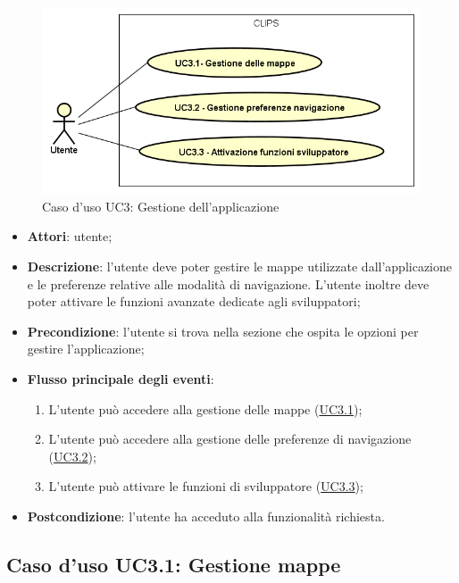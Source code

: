 \documentclass[../AnalisiDeiRequisiti.tex]{subfiles}
\begin{document}
        \begin{figure}[!h]
            \centering
            \includegraphics[scale=0.95, width=\textwidth]{img/UC3.png}
            \caption{Caso d'uso UC3: Gestione dell'applicazione}\label{fig:UC3} 
        \end{figure}
\begin{itemize}
\item \textbf{Attori}: utente;
\item \textbf{Descrizione}: l'utente deve poter gestire le mappe utilizzate dall'applicazione e le preferenze relative alle modalità di navigazione. L'utente inoltre deve poter attivare le funzioni avanzate dedicate agli sviluppatori; 
      \item \textbf{Precondizione}: l'utente si trova nella sezione che ospita le opzioni per gestire l'applicazione;

        \item \textbf{Flusso principale degli eventi}:
          \begin{enumerate}
          \item L'utente può accedere alla gestione delle mappe (\hyperlink{UC3.1}{UC3.1});
          \item L'utente può accedere alla gestione delle preferenze di navigazione (\hyperlink{UC3.2}{UC3.2});
          \item L'utente può attivare le funzioni di sviluppatore (\hyperlink{UC3.3}{UC3.3});

      \end{enumerate}
    \item \textbf{Postcondizione}: l'utente ha acceduto alla funzionalità richiesta.
  \end{itemize}
\hypertarget{UC3.1}{}
\subsection{Caso d'uso UC3.1: Gestione mappe}
\end{document}
